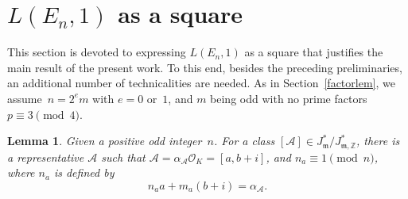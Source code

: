 \documentclass[11pt, reqno]{amsart}
\theoremstyle{plain}
\newtheorem{lemma}[theorem]{Lemma}
\theoremstyle{definition}
\numberwithin{equation}{section}
\begin{document}




\section{$L(E_{n},1)$ as a square}\label{square}

This section is devoted to expressing $L(E_{n},1)$ as a square that justifies the main result of the present work. To this end, besides the preceding preliminaries, an additional number of technicalities are needed. As  in Section~\ref{factorlem}, we assume~$n=2^{e}m$ with $e=0$ or~$1$, and $m$ being odd with no prime factors~$p\equiv3\pmod{4}$.
















\begin{lemma}\label{lemna}
Given a positive odd integer~$n$.    For a class $[\mathcal{A}]\in J_{\mathfrak{m}}^{*}/J_{\mathfrak{m},\mathbb{Z}}^{*}$,  there is a representative $\mathcal{A}$ such that $\mathcal{A}=\alpha_{\mathcal{A}}\mathcal{O}_{K}=[a,b+i]$, and $n_{a}\equiv1\pmod{n}$, where $n_{a}$ is defined by
$$
n_{a}a+m_{a}(b+i)=\alpha_{\mathcal{A}}.
$$

\end{lemma}
\end{document}
